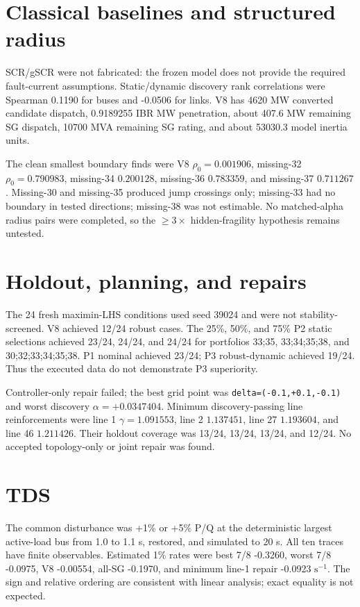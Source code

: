 \documentclass[10pt,a4paper]{article}
\begin{document}
\section{Classical baselines and structured radius}
SCR/gSCR were not fabricated: the frozen model does not provide the required fault-current assumptions. Static/dynamic discovery rank correlations were Spearman 0.1190 for buses and -0.0506 for links. V8 has 4620 MW converted candidate dispatch, 0.9189255 IBR MW penetration, about 407.6 MW remaining SG dispatch, 10700 MVA remaining SG rating, and about 53030.3 model inertia units.

The clean smallest boundary finds were V8 $\rho_0=0.001906$, missing-32 $\rho_0=0.790983$, missing-34 $0.200128$, missing-36 $0.783359$, and missing-37 $0.711267$. Missing-30 and missing-35 produced jump crossings only; missing-33 had no boundary in tested directions; missing-38 was not estimable. No matched-alpha radius pairs were completed, so the $\ge3\times$ hidden-fragility hypothesis remains untested.

\section{Holdout, planning, and repairs}
The 24 fresh maximin-LHS conditions used seed 39024 and were not stability-screened. V8 achieved 12/24 robust cases. The 25\%, 50\%, and 75\% P2 static selections achieved 23/24, 24/24, and 24/24 for portfolios 33;35, 33;34;35;38, and 30;32;33;34;35;38. P1 nominal achieved 23/24; P3 robust-dynamic achieved 19/24. Thus the executed data do not demonstrate P3 superiority.

Controller-only repair failed; the best grid point was \texttt{delta=(-0.1,+0.1,-0.1)} and worst discovery $\alpha=+0.0347404$. Minimum discovery-passing line reinforcements were line 1 $\gamma=1.091553$, line 2 $1.137451$, line 27 $1.193604$, and line 46 $1.211426$. Their holdout coverage was 13/24, 13/24, 13/24, and 12/24. No accepted topology-only or joint repair was found.

\section{TDS}
The common disturbance was +1\% or +5\% P/Q at the deterministic largest active-load bus from 1.0 to 1.1 s, restored, and simulated to 20 s. All ten traces have finite observables. Estimated 1\% rates were best 7/8 -0.3260, worst 7/8 -0.0975, V8 -0.00554, all-SG -0.1970, and minimum line-1 repair -0.0923 $\mathrm{s}^{-1}$. The sign and relative ordering are consistent with linear analysis; exact equality is not expected.
\end{document}
